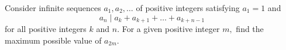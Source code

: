 Consider infinite sequences $a_1,a_2,\dots$ of positive integers satisfying $a_1=1$ and $$a_n \mid a_k+a_{k+1}+\dots+a_{k+n-1}$$for all positive integers $k$ and $n.$ For a given positive integer $m,$ find the maximum possible value of $a_{2m}.$

